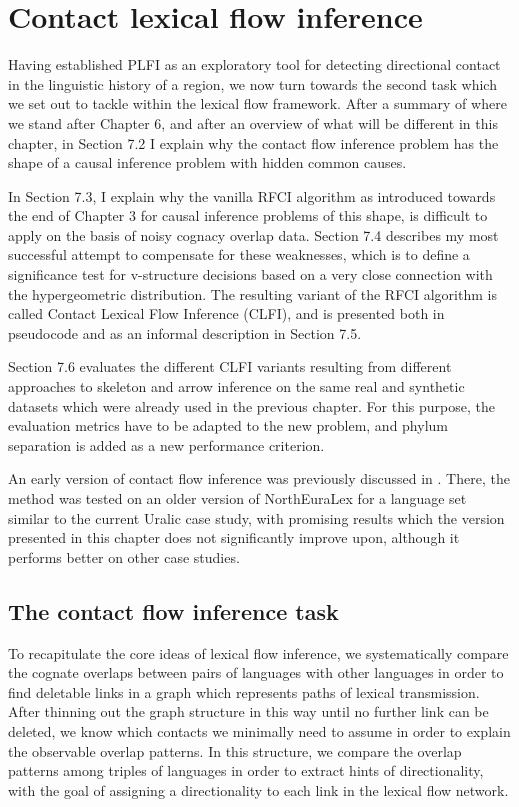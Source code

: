 \chapter{Contact lexical flow inference}
Having established PLFI as an exploratory tool for detecting directional contact in the linguistic history of a region, we now turn towards the second task which we set out to tackle within the lexical flow framework. After a summary of where we stand after Chapter 6, and after an overview of what will be different in this chapter, in Section 7.2 I explain why the contact flow inference problem has the shape of a causal inference problem with hidden common causes. 

In Section 7.3, I explain why the vanilla RFCI algorithm as introduced towards the end of Chapter 3 for causal inference problems of this shape, is difficult to apply on the basis of noisy cognacy overlap data. Section 7.4 describes my most successful attempt to compensate for these weaknesses, which is to define a significance test for v-structure decisions based on a very close connection with the hypergeometric distribution. The resulting variant of the RFCI algorithm is called Contact Lexical Flow Inference (CLFI), and is presented both in pseudocode and as an informal description in Section 7.5. 

Section 7.6 evaluates the different CLFI variants resulting from different approaches to skeleton and arrow inference on the same real and synthetic datasets which were already used in the previous chapter. For this purpose, the evaluation metrics have to be adapted to the new problem, and phylum separation is added as a new performance criterion.

An early version of contact flow inference was previously discussed in \cite{dellert2016a}. There, the method was tested on an older version of NorthEuraLex for a language set similar to the current Uralic case study, with promising results which the version presented in this chapter does not significantly improve upon, although it performs better on other case studies.

\section{The contact flow inference task}
To recapitulate the core ideas of lexical flow inference, we systematically compare the cognate overlaps between pairs of languages with other languages in order to find deletable links in a graph which represents paths of lexical transmission. After thinning out the graph structure in this way until no further link can be deleted, we know which contacts we minimally need to assume in order to explain the observable overlap patterns. In this structure, we compare the overlap patterns among triples of languages in order to extract hints of directionality, with the goal of assigning a directionality to each link in the lexical flow network.

